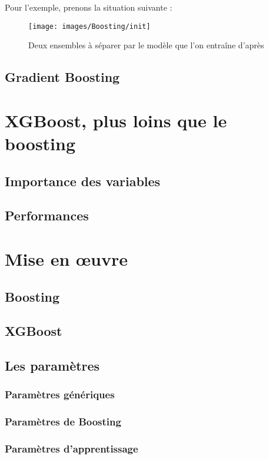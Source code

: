 \documentclass[11pt,a4paper]{article}
\begin{document}
Pour l'exemple, prenons la situation suivante :

\begin{figure}[h!]
	\centering
	\texttt{[image: images/Boosting/init]}
	\begin{sidecaption}
		Deux ensembles à séparer par le modèle que l'on entraîne d'après~\cite{bib:elghazel}
	\end{sidecaption}
	\label{fig:boosting_init}
\end{figure}

\subsection{Gradient Boosting}
\label{sec:gradient-boosting}
\section{XGBoost, plus loins que le boosting}
\subsection{Importance des variables}
\subsection{Performances}
\label{sec:perf}

\section{Mise en \oe uvre}
\subsection{Boosting}
\subsection{XGBoost}
\subsection{Les paramètres}
\subsubsection{Paramètres génériques}
\subsubsection{Paramètres de Boosting}
\subsubsection{Paramètres d'apprentissage}
\end{document}
